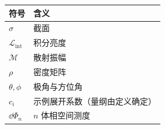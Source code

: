 \begin{longtable}{@{}p{}p{}@{}}
\toprule
符号 & 含义 \\
\midrule
\endhead
$\sigma$ & 截面 \\
$\mathcal{L}_{\mathrm{int}}$ & 积分亮度 \\
$\mathcal{M}$ & 散射振幅 \\
$\rho$ & 密度矩阵 \\
$\theta,\phi$ & 极角与方位角 \\
$c_i$ & 示例展开系数（量纲由定义确定） \\
$\dd\Phi_n$ & $n$ 体相空间测度 \\
\bottomrule
\end{longtable}
